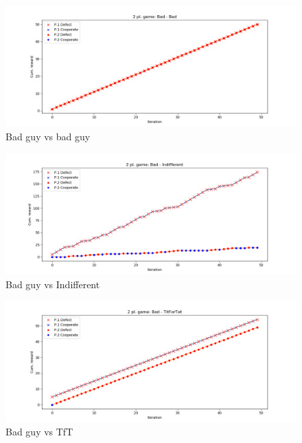 \documentclass[journal,a4paper,10pt,twoside]{IEEEtran}
\begin{document}
\begin{figure}[ht]
    \centering
    \includegraphics[width=1\columnwidth]{../img_v1/idp2p-rewards-Bad-Bad.png}
    \caption{Bad guy vs bad guy}
    \label{fig:badvsbad}
\end{figure}

\begin{figure}[ht]
    \centering
    \includegraphics[width=1\columnwidth]{../img_v1/idp2p-rewards-Bad-Indifferent.png}
    \caption{Bad guy vs Indifferent}
    \label{fig:badvsindiff}
\end{figure}

\begin{figure}[ht]
    \centering
    \includegraphics[width=1\columnwidth]{../img_v1/idp2p-rewards-Bad-TitForTat.png}
    \caption{Bad guy vs TfT}
    \label{fig:badvstft}
\end{figure}
\end{document}
